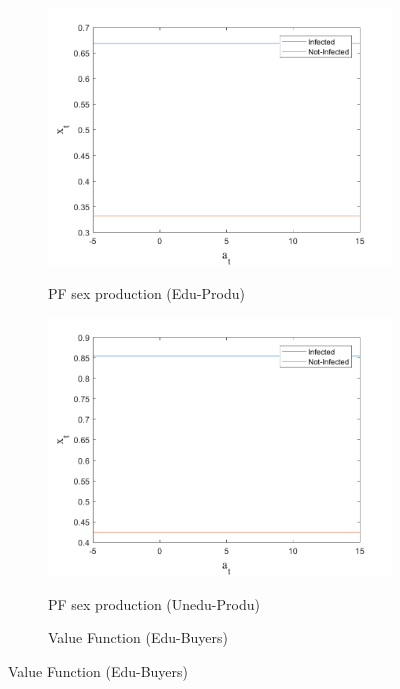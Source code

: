 \begin{figure}[H]
\bigskip
\begin{subfigure}{0.5\textwidth}\caption{PF sex production (Edu-Produ)}
   \includegraphics[width=\linewidth,height = 0.22\textheight]{figures/matu/FIG11.png}
    \label{fig_dert}
\end{subfigure}
\hspace*{\fill}
\begin{subfigure}{0.5\textwidth}\caption{PF sex production (Unedu-Produ)}
   \includegraphics[width=\linewidth,height = 0.22\textheight]{figures/matu/FIG12.png}
    \label{fig:x_b}
\end{subfigure}
\bigskip
\begin{subfigure}{0.5\textwidth}\caption{Value Function (Edu-Buyers)}

\end{subfigure}
\end{figure}
